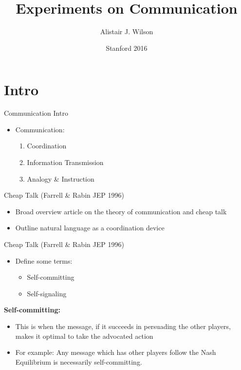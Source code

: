 \documentclass{beamer}
\begin{document}
\section{Intro}
\title{Experiments on Communication }
\author{Alistair J. Wilson }
\date{Stanford 2016}
 \maketitle

\begin{frame}{Communication Intro}
	\begin{itemize}
		\item Communication:
		\begin{enumerate}
			\item Coordination
			\item Information Transmission
			\item Analogy \& Instruction
		\end{enumerate}
	\end{itemize}
\end{frame}

\begin{frame}{Cheap Talk (Farrell \& Rabin JEP 1996)}
	\begin{itemize}
		\item Broad overview article on the theory of communication and cheap talk
		\item Outline natural language as a coordination device
	\end{itemize}
\end{frame}

\begin{frame}{Cheap Talk (Farrell \& Rabin JEP 1996)}
	\begin{itemize}
		\item Define some terms:
		\begin{itemize}
			\item Self-committing
			\item Self-signaling
		\end{itemize}
	\end{itemize}
\end{frame}

\begin{frame}
 \textbf{Self-committing:}
		\begin{itemize}
			\item This is when the message, if it succeeds in persuading the other players, makes it optimal to take the advocated action
			\item For example: Any message which has other players follow the Nash Equilibrium is necessarily self-committing.
		\end{itemize}
\end{frame}
\end{document}
